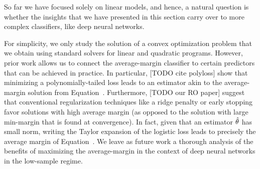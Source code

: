 So far we have focused solely on linear models, and hence, a natural question is
whether the insights that we have presented in this section carry over to more
complex classifiers, like deep neural networks.

For simplicity, we only study the solution of a convex optimization problem that
we obtain using standard solvers for linear and quadratic programs. However,
prior work allows us to connect the average-margin classifier to certain
predictors that can be achieved in practice.  In particular, [TODO cite
polyloss] show that minimizing a polynomially-tailed loss leads to an estimator
akin to the average-margin solution from Equation~. Furthermore,
[TODO our RO paper] suggest that conventional regularization techniques like a
ridge penalty or early stopping favor solutions with high average margin (as
opposed to the solution with large min-margin that is found at convergence). In
fact, given that an estimator $\hat{\theta}$ has small norm, writing the Taylor
expansion of the logistic loss leads to precisely the average margin of
Equation~.  We leave as future work a thorough analysis of the benefits
of maximizing the average-margin in the context of deep neural networks in the
low-sample regime.

